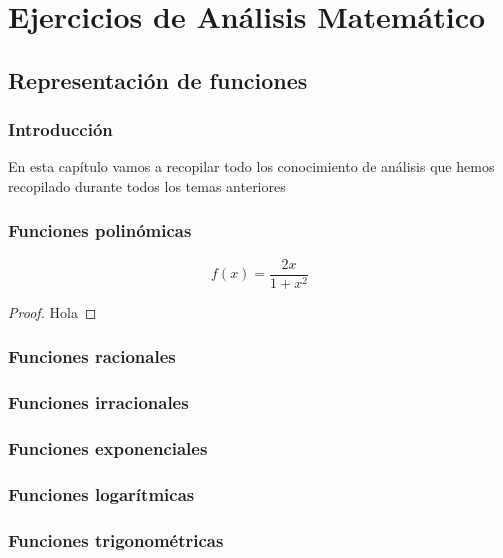 \part{Ejercicios de Análisis Matemático}

\chapter{Representación de funciones}
\minitoc

\section*{Introducción}

En esta capítulo vamos a recopilar todo los conocimiento de análisis que hemos recopilado durante todos los temas anteriores
\section{Funciones polinómicas}

\begin{ejercicio}
$$
f(x)=\dfrac{2x}{1+x^2}$$
\end{ejercicio}

\begin{proof}
Hola
\end{proof}

\section{Funciones racionales}


\section{Funciones irracionales}
\section{Funciones exponenciales}
\section{Funciones logarítmicas}
\section{Funciones trigonométricas}